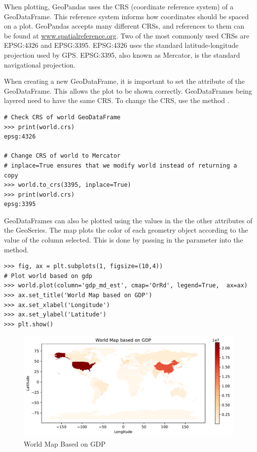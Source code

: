 When plotting, GeoPandas uses the CRS (coordinate reference system) of a GeoDataFrame.
This reference system informs how coordinates should be spaced on a plot.
GeoPandas accepts many different CRSs, and references to them can be found at \url{www.spatialreference.org}.
Two of the most commonly used CRSs are EPSG:4326 and EPSG:3395.
EPSG:4326 uses the standard latitude-longitude projection used by GPS.
EPSG:3395, also known as Mercator, is the standard navigational projection.

When creating a new GeoDataFrame, it is important to set the  attribute of the GeoDataFrame.
This allows the plot to be shown correctly.
GeoDataFrames being layered need to have the same CRS.
To change the CRS, use the method .

\begin{lstlisting}
# Check CRS of world GeoDataFrame
>>> print(world.crs)
epsg:4326

# Change CRS of world to Mercator
# inplace=True ensures that we modify world instead of returning a copy
>>> world.to_crs(3395, inplace=True)
>>> print(world.crs)
epsg:3395
\end{lstlisting}

GeoDataFrames can also be plotted using the values in the the other attributes of the GeoSeries.
The map plots the color of each geometry object according to the value of the column selected.
This is done by passing in the parameter  into the  method.

\begin{lstlisting}
>>> fig, ax = plt.subplots(1, figsize=(10,4))
# Plot world based on gdp
>>> world.plot(column='gdp_md_est', cmap='OrRd', legend=True,  ax=ax)
>>> ax.set_title('World Map based on GDP')
>>> ax.set_xlabel('Longitude')
>>> ax.set_ylabel('Latitude')
>>> plt.show()
\end{lstlisting}

\begin{figure}[H]
\begin{center}
\includegraphics[scale=.7]{figures/gdp.pdf}
\end{center}
\caption{World Map Based on GDP}
\label{figure:gdp_map}
\end{figure}


